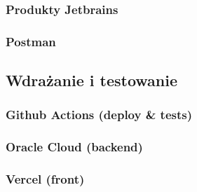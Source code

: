 \subsubsection{Produkty Jetbrains}

\subsubsection{Postman}


\subsection{Wdrażanie i testowanie}

\subsubsection{Github Actions (deploy \& tests)}


\subsubsection{Oracle Cloud (backend)}

\subsubsection{Vercel (front)}
